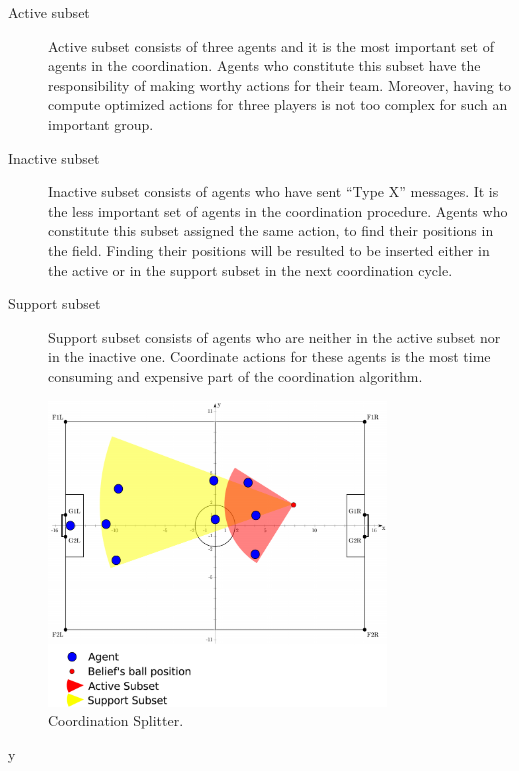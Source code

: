 \begin{description}
\item[Active subset] Active subset consists of three agents and it is the most important set of agents in the coordination. Agents who constitute this subset have the responsibility of making worthy actions for their team. Moreover, having to compute optimized actions for three players is not too complex for such an important group. 

\item[Inactive subset] Inactive subset consists of agents who have sent ``Type X'' messages. It is the less important set of agents in the coordination procedure. Agents who constitute this subset assigned the same action, to find their positions in the field. Finding their positions will be resulted to be inserted either in the active or in the support subset in the next coordination cycle.

\item[Support subset] Support subset consists of agents who are neither in the active subset nor in the inactive one. Coordinate actions for these agents is the most time consuming and expensive part of the coordination algorithm.
\end{description}

\begin{figure}[t!]
\centering
  \includegraphics[width=0.8\textwidth]{Chapter4/figures/Splitter.pdf}
  \caption{Coordination Splitter.} 
  \label{fig:Splitter}
\end{figure}
y
